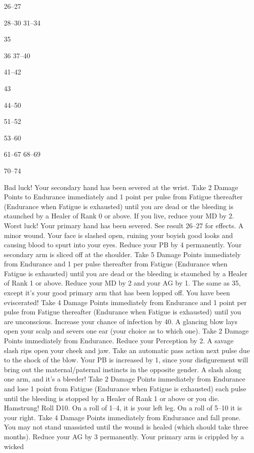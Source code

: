 \documentclass[a4paper]{article}
\begin{document}
\begin{multicols}{3}
26–27

28–30
31–34

35

36
37–40

41–42

43

44–50

51–52

53–60

61–67
68–69

70–74

Bad luck! Your secondary hand has been
severed at the wrist. Take 2 Damage
Points to Endurance immediately and 1
point per pulse from Fatigue thereafter
(Endurance when Fatigue is exhausted)
until you are dead or the bleeding is
staunched by a Healer of Rank 0 or
above. If you live, reduce your MD by 2.
Worst luck! Your primary hand has been
severed. See result 26–27 for effects.
A minor wound. Your face is slashed
open, ruining your boyish good looks and
causing blood to spurt into your eyes.
Reduce your PB by 4 permanently.
Your secondary arm is sliced off at the
shoulder. Take 5 Damage Points immediately from Endurance and 1 per pulse
thereafter from Fatigue (Endurance when
Fatigue is exhausted) until you are dead
or the bleeding is staunched by a Healer
of Rank 1 or above. Reduce your MD by
2 and your AG by 1.
The same as 35, except it’s your good
primary arm that has been lopped off.
You have been eviscerated! Take 4 Damage Points immediately from Endurance
and 1 point per pulse from Fatigue thereafter (Endurance when Fatigue is exhausted) until you are unconscious. Increase your chance of infection by 40.
A glancing blow lays open your scalp and
severs one ear (your choice as to which
one). Take 2 Damage Points immediately
from Endurance. Reduce your Perception
by 2.
A savage slash rips open your cheek and
jaw. Take an automatic pass action next
pulse due to the shock of the blow. Your
PB is increased by 1, since your disfigurement will bring out the maternal/paternal instincts in the opposite gender.
A slash along one arm, and it’s a bleeder!
Take 2 Damage Points immediately from
Endurance and lose 1 point from Fatigue
(Endurance when Fatigue is exhausted)
each pulse until the bleeding is stopped by
a Healer of Rank 1 or above or you die.
Hamstrung! Roll D10. On a roll of 1–4, it
is your left leg. On a roll of 5–10 it is your
right. Take 4 Damage Points immediately
from Endurance and fall prone. You may
not stand unassisted until the wound is
healed (which should take three months).
Reduce your AG by 3 permanently.
Your primary arm is crippled by a wicked

\end{multicols}
\end{document}
